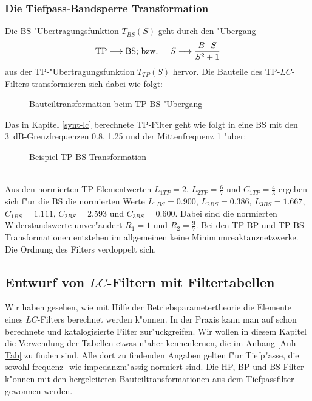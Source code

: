 \subsubsection{Die Tiefpass-Bandsperre Transformation}
Die BS-"Ubertragungsfunktion $T_{BS}(S)$ geht durch den "Ubergang
\begin{eqnarray*}
{\rm TP}  \longrightarrow  {\rm BS}&\text{; bzw.   }& S  \longrightarrow  \frac{B \cdot S}{S^2 + 1}
\end{eqnarray*}
aus der TP-"Ubertragungsfunktion $T_{TP}(S)$ hervor. Die Bauteile
des TP-$LC$-Filters transformieren sich dabei wie folgt:
\begin{figure}[!htb]
\begin{center}
  \caption{Bauteiltransformation beim TP-BS "Ubergang}
\end{center}
\vspace*{-6mm}
\end{figure}
\bsp{}
Das in Kapitel \ref{synt-lc} berechnete TP-Filter geht wie folgt in eine BS
mit den 3~dB-Grenzfrequenzen 0.8, 1.25 und der Mittenfrequenz 1 "uber:
\begin{figure}[!htb]
\vspace*{-3mm}
\begin{center}
  \caption{Beispiel TP-BS Transformation}
\end{center}
\vspace*{-6mm}
\end{figure}\\
\nit Aus den normierten TP-Elementwerten $L_{1TP}=2$, $L_{2TP}=\frac{6}{7}$ und 
$C_{1TP}=\frac{4}{3}$ ergeben sich f"ur die BS die normierten Werte
$L_{1BS}=0.900$, $L_{2BS}=0.386$, $L_{3BS}=1.667$, $C_{1BS}=1.111$,
$C_{2BS}=2.593$ und $C_{3BS}=0.600$.  Dabei sind die normierten
Widerstandswerte unver"andert $R_1=1$ und $R_2=\frac{9}{7}$.  Bei den
TP-BP und TP-BS Transformationen entstehen im allgemeinen keine
Minimumreaktanznetzwerke. Die Ordnung
des Filters verdoppelt sich.
\subsection{Entwurf von {\boldmath $LC$}-Filtern mit Filtertabellen \label{ent-mit-tab}}
Wir haben gesehen, wie mit Hilfe der Betriebsparametertheorie die
Elemente eines $LC$-Filters berechnet werden k"onnen. In der Praxis kann
man auf schon berechnete und katalogisierte Filter zur"uckgreifen. Wir
wollen in diesem Kapitel die Verwendung der Tabellen etwas n"aher
kennenlernen, die im Anhang \ref{Anh-Tab} zu finden sind. Alle dort
zu findenden Angaben gelten f"ur Tiefp"asse, die sowohl frequenz- wie
impedanzm"assig normiert sind.  Die HP, BP und BS Filter k"onnen mit
den hergeleiteten Bauteiltransformationen aus dem Tiefpassfilter
gewonnen werden.
